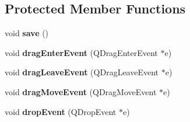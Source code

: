 \subsection*{Protected Member Functions}
\begin{DoxyCompactItemize}
\item 
void {\bfseries save} ()\hypertarget{classMainWindow_a3ba1a371fb10e731ae0926ae85efeb4f}{}\label{classMainWindow_a3ba1a371fb10e731ae0926ae85efeb4f}

\item 
void {\bfseries drag\+Enter\+Event} (Q\+Drag\+Enter\+Event $\ast$e)\hypertarget{classMainWindow_a5ae38bc4de99d7ea1234c37697d5908c}{}\label{classMainWindow_a5ae38bc4de99d7ea1234c37697d5908c}

\item 
void {\bfseries drag\+Leave\+Event} (Q\+Drag\+Leave\+Event $\ast$e)\hypertarget{classMainWindow_a4dbcf48c14295e78b3016e2d99d9ee91}{}\label{classMainWindow_a4dbcf48c14295e78b3016e2d99d9ee91}

\item 
void {\bfseries drag\+Move\+Event} (Q\+Drag\+Move\+Event $\ast$e)\hypertarget{classMainWindow_aa869107942e906c33003c01cb56a6881}{}\label{classMainWindow_aa869107942e906c33003c01cb56a6881}

\item 
void {\bfseries drop\+Event} (Q\+Drop\+Event $\ast$e)\hypertarget{classMainWindow_aae0d7740b8934fb20d7d49d485e99b2c}{}\label{classMainWindow_aae0d7740b8934fb20d7d49d485e99b2c}

\end{DoxyCompactItemize}
